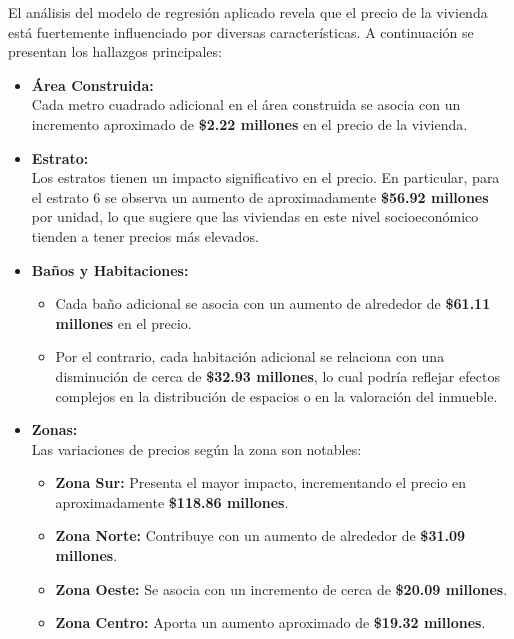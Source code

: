 \documentclass[
]{article}
\providecommand{\tightlist}{%
  \setlength{\itemsep}{0pt}\setlength{\parskip}{0pt}}
\begin{document}
El análisis del modelo de regresión aplicado revela que el precio de la
vivienda está fuertemente influenciado por diversas características. A
continuación se presentan los hallazgos principales:

\begin{itemize}
\item
  \textbf{Área Construida:}\\
  Cada metro cuadrado adicional en el área construida se asocia con un
  incremento aproximado de \textbf{\$2.22 millones} en el precio de la
  vivienda.
\item
  \textbf{Estrato:}\\
  Los estratos tienen un impacto significativo en el precio. En
  particular, para el estrato 6 se observa un aumento de aproximadamente
  \textbf{\$56.92 millones} por unidad, lo que sugiere que las viviendas
  en este nivel socioeconómico tienden a tener precios más elevados.
\item
  \textbf{Baños y Habitaciones:}

  \begin{itemize}
  \tightlist
  \item
    Cada baño adicional se asocia con un aumento de alrededor de
    \textbf{\$61.11 millones} en el precio.\\
  \item
    Por el contrario, cada habitación adicional se relaciona con una
    disminución de cerca de \textbf{\$32.93 millones}, lo cual podría
    reflejar efectos complejos en la distribución de espacios o en la
    valoración del inmueble.
  \end{itemize}
\item
  \textbf{Zonas:}\\
  Las variaciones de precios según la zona son notables:

  \begin{itemize}
  \tightlist
  \item
    \textbf{Zona Sur:} Presenta el mayor impacto, incrementando el
    precio en aproximadamente \textbf{\$118.86 millones}.
  \item
    \textbf{Zona Norte:} Contribuye con un aumento de alrededor de
    \textbf{\$31.09 millones}.
  \item
    \textbf{Zona Oeste:} Se asocia con un incremento de cerca de
    \textbf{\$20.09 millones}.
  \item
    \textbf{Zona Centro:} Aporta un aumento aproximado de
    \textbf{\$19.32 millones}.
  \end{itemize}
\end{itemize}
\end{document}
